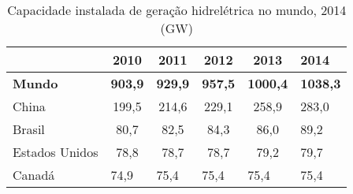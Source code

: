 \begin{table}[!ht]
	\centering
	\begin{tabular}{lccccl}
		\rowcolor[HTML]{9B9B9B} 
		\multicolumn{1}{c}{\cellcolor[HTML]{9B9B9B}} & {\color[HTML]{FFFFFF} \textbf{2010}} & {\color[HTML]{FFFFFF} \textbf{2011}} & {\color[HTML]{FFFFFF} \textbf{2012}} & {\color[HTML]{FFFFFF} \textbf{2013}} & {\color[HTML]{FFFFFF} \textbf{2014}} \\ \hline
		\textbf{Mundo}                               & \multicolumn{1}{l}{\textbf{903,9}}   & \multicolumn{1}{l}{\textbf{929,9}}   & \multicolumn{1}{l}{\textbf{957,5}}   & \multicolumn{1}{l}{\textbf{1000,4}}  & \textbf{1038,3}                      \\ \hline
		\rowcolor[HTML]{DDDDDD} 
		China                                        & 199,5                                & 214,6                                & 229,1                                & 258,9                                & 283,0                                \\
		Brasil                                       & 80,7                                 & 82,5                                 & 84,3                                 & 86,0                                 & 89,2                                 \\
		\rowcolor[HTML]{DDDDDD} 
		Estados Unidos                               & 78,8                                 & 78,7                                 & 78,7                                 & 79,2                                 & 79,7                                 \\
		Canadá                                       & \multicolumn{1}{l}{74,9}             & \multicolumn{1}{l}{75,4}             & \multicolumn{1}{l}{75,4}             & \multicolumn{1}{l}{75,4}             & 75,4                                
	\end{tabular}
	\caption{Capacidade instalada de geração hidrelétrica no mundo, 2014 (GW)}
	\label{cap_hidro}
\end{table}

